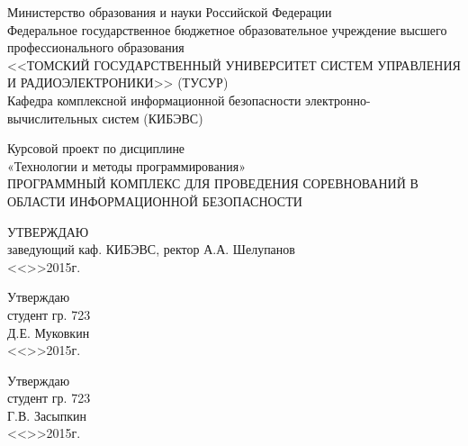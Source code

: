 \newpage
{}

\begin{center}
 Министерство образования и науки Российской Федерации\\
 Федеральное государственное бюджетное образовательное учреждение высшего профессионального образования\\
 <<ТОМСКИЙ ГОСУДАРСТВЕННЫЙ УНИВЕРСИТЕТ СИСТЕМ УПРАВЛЕНИЯ И РАДИОЭЛЕКТРОНИКИ>> (ТУСУР)\\
 Кафедра комплексной информационной безопасности электронно-вычислительных систем (КИБЭВС)\\
\end{center}


\begin{center}
Курсовой проект по дисциплине \\
«Технологии и методы программирования» \\
ПРОГРАММНЫЙ КОМПЛЕКС ДЛЯ ПРОВЕДЕНИЯ СОРЕВНОВАНИЙ В ОБЛАСТИ ИНФОРМАЦИОННОЙ БЕЗОПАСНОСТИ
\end{center}
\vfill

\begin{flushleft}
\begin{minipage}{0.45\textwidth}
 \begin{flushright}
  УТВЕРЖДАЮ\\
  заведующий каф. КИБЭВС, ректор
  \underline{\hspace{3cm}}А.А. Шелупанов \\
  <<\underline{\hspace{1cm}}>>\underline{\hspace{3cm}}2015г.\\
 \end{flushright}
\end{minipage}
\end{flushleft}

\vfill

\vfill
\begin{flushright}
\begin{minipage}{0.45\textwidth}
 \begin{flushleft}
  Утверждаю \\
  студент гр. 723 \\
  \underline{\hspace{3cm}}Д.Е. Муковкин \\
  <<\underline{\hspace{1cm}}>>\underline{\hspace{3cm}}2015г.\\
 \end{flushleft}
 \begin{flushleft}
  Утверждаю \\
  студент гр. 723 \\
  \underline{\hspace{3cm}}Г.В. Засыпкин \\
  <<\underline{\hspace{1cm}}>>\underline{\hspace{3cm}}2015г.\\
 \end{flushleft}
\end{minipage}
\end{flushright}

